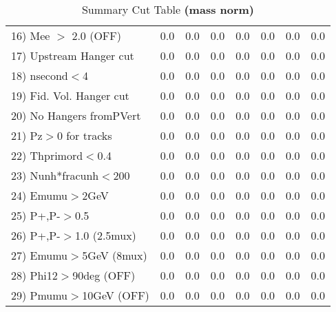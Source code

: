 \begin{table}[h!]
{{\begin{tabular}{||l||r|r|r|r|r||r||r||}
 16) Mee $>$ 2.0  (OFF)   &       0.0 &       0.0 &       0.0 &       0.0 &       0.0 &       0.0 &       0.0 \\
 17) Upstream Hanger cut  &       0.0 &       0.0 &       0.0 &       0.0 &       0.0 &       0.0 &       0.0 \\
 18) nsecond$<$4          &       0.0 &       0.0 &       0.0 &       0.0 &       0.0 &       0.0 &       0.0 \\
 19) Fid. Vol. Hanger cut &       0.0 &       0.0 &       0.0 &       0.0 &       0.0 &       0.0 &       0.0 \\
 20) No Hangers fromPVert &       0.0 &       0.0 &       0.0 &       0.0 &       0.0 &       0.0 &       0.0 \\
 21) Pz$>$0 for tracks    &       0.0 &       0.0 &       0.0 &       0.0 &       0.0 &       0.0 &       0.0 \\
 22) Thprimord$<$0.4      &       0.0 &       0.0 &       0.0 &       0.0 &       0.0 &       0.0 &       0.0 \\
 23) Nunh*fracunh$<$200   &       0.0 &       0.0 &       0.0 &       0.0 &       0.0 &       0.0 &       0.0 \\
 24) Emumu$>$2GeV         &       0.0 &       0.0 &       0.0 &       0.0 &       0.0 &       0.0 &       0.0 \\
 25) P+,P-$>$0.5          &       0.0 &       0.0 &       0.0 &       0.0 &       0.0 &       0.0 &       0.0 \\
 26) P+,P-$>$1.0 (2.5mux) &       0.0 &       0.0 &       0.0 &       0.0 &       0.0 &       0.0 &       0.0 \\
 27) Emumu$>$5GeV  (8mux) &       0.0 &       0.0 &       0.0 &       0.0 &       0.0 &       0.0 &       0.0 \\
 28) Phi12$>$90deg  (OFF) &       0.0 &       0.0 &       0.0 &       0.0 &       0.0 &       0.0 &       0.0 \\
 29) Pmumu$>$10GeV  (OFF) &       0.0 &       0.0 &       0.0 &       0.0 &       0.0 &       0.0 &       0.0 \\
 \hline
 \hline
 \end{tabular}
 \caption{Summary Cut Table \textbf{ (mass norm) }}
 \label{tab-sumcut}
 }}
 \end{table}
 \endinput
